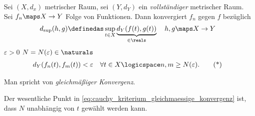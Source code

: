 \begin{lemma}\label{cauchy_kriterium_gleichmaessige_konvergenz}
    \begin{eigenschaftenenumerate}
        \item Sei \( (X,d_x)\) metrischer Raum, sei \( (Y,d_Y)\) ein \emph{vollständiger} metrischer Raum. Sei \( f_n\maps X\to Y\) Folge von Funktionen. Dann konvergiert \( f_n\) gegen \( f\) bezüglich
        \begin{align*}
            d_{\sup}(h,g)\definedas \sup_{t\in X} \underbrace {d_{Y}(f(t),g(t))}_{\in \reals } \quad h,g\maps X\to Y
        \end{align*}
        \tiff \tforall \( \varepsilon>0\) \texists \( N=N(\varepsilon)\in \naturals \) \sd
        \begin{align*}
            d_Y(f_n(t),f_m(t))<\varepsilon \quad \forall t\in X\logicspace n,m\geq N(\varepsilon).\tag{*}\label{eq:cauchy_kriterium_gleichmaessige_konvergenz}
        \end{align*} 
        \begin{notation*}
            Man spricht von \emph{gleichmäßiger Konvergenz}.
        \end{notation*}
         Der wesentliche Punkt in \eqref{eq:cauchy_kriterium_gleichmaessige_konvergenz} ist, dass \( N\) unabhängig von \( t\) gewählt werden kann.
        

\end{eigenschaftenenumerate}
\end{lemma}
